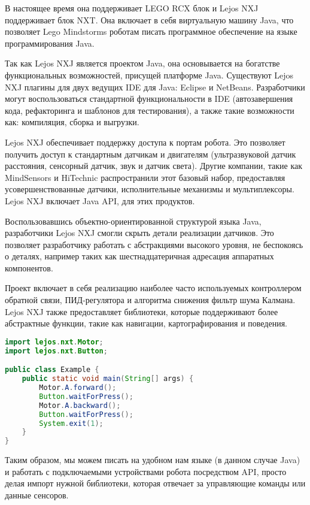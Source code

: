 В настоящее время она поддерживает LEGO RCX блок и Lejos NXJ поддерживает блок NXT. Она включает в себя виртуальную машину Java, что позволяет Lego Mindstorms роботам писать программное обеспечение на языке программирования Java. 

Так как Lejos NXJ является проектом Java, она основывается на богатстве функциональных возможностей, присущей платформе Java. Существуют Lejos NXJ плагины для двух ведущих IDE для Java: Eclipse и NetBeans. Разработчики могут воспользоваться стандартной функциональности в IDE (автозавершения кода, рефакторинга и шаблонов для тестирования), а также такие возможности как: компиляция, сборка и выгрузки. 

Lejos NXJ обеспечивает поддержку доступа к портам робота. Это позволяет получить доступ к стандартным датчикам и двигателям (ультразвуковой датчик расстояния, сенсорный датчик, звук и датчик света). Другие компании, такие как MindSensors и HiTechnic распространили этот базовый набор, предоставляя усовершенствованные датчики, исполнительные механизмы и мультиплексоры. Lejos NXJ включает Java API, для этих продуктов.

Воспользовавшись объектно-ориентированной структурой языка Java, разработчики Lejos NXJ смогли скрыть детали реализации датчиков. Это позволяет разработчику работать с абстракциями высокого уровня, не беспокоясь о деталях, например таких как шестнадцатеричная адресация аппаратных компонентов.

Проект включает в себя реализацию наиболее часто используемых контроллером обратной связи, ПИД-регулятора и алгоритма снижения фильтр шума Калмана. Lejos NXJ также предоставляет библиотеки, которые поддерживают более абстрактные функции, такие как навигации, картографирования и поведения.

\begin{lstlisting}[caption={Пример кода для работы с двигателями}, language=Java]
import lejos.nxt.Motor;
import lejos.nxt.Button;

public class Example {
    public static void main(String[] args) {
        Motor.A.forward();
        Button.waitForPress();
        Motor.A.backward();
        Button.waitForPress();
        System.exit(1);
    }
}
\end{lstlisting}


Таким образом, мы можем писать на удобном нам языке (в данном случае Java) и работать с подключаемыми устройствами робота посредством API, просто делая импорт нужной библиотеки, которая отвечает за управляющие команды или данные сенсоров.




